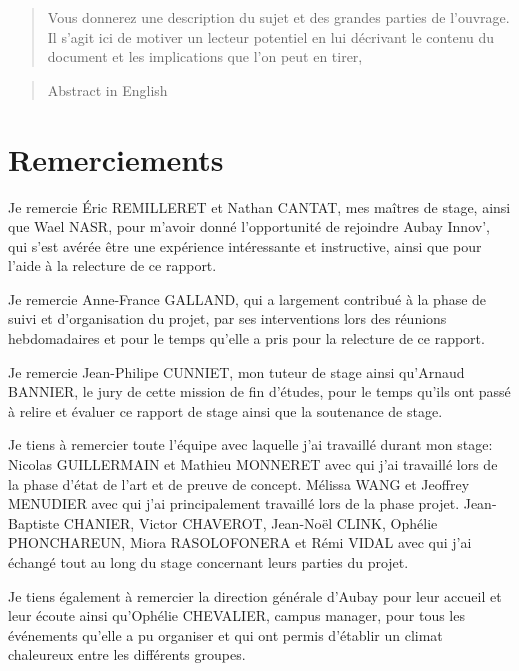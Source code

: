 \documentclass[11pt]{article}
\begin{document}
  \begin{abstract}
    Vous donnerez une description du
    sujet et des grandes parties de l’ouvrage. Il s’agit ici de motiver un lecteur potentiel en lui
    décrivant le contenu du document et les implications que l’on peut en tirer,
  \end{abstract}
  \pagebreak

  \begin{abstract}
    Abstract in English
  \end{abstract}
  \pagebreak

  \setcounter{tocdepth}{3}
  \tableofcontents

  \pagebreak

  \section{Remerciements}    
    Je remercie Éric REMILLERET et Nathan CANTAT, mes maîtres de stage, 
    ainsi que Wael NASR, pour m'avoir donné l'opportunité de rejoindre 
    Aubay Innov', qui s'est avérée être une expérience intéressante 
    et instructive, ainsi que pour l'aide à la relecture de ce rapport.    
    
    Je remercie Anne-France GALLAND, qui a largement contribué à la phase de suivi et d'organisation du projet, par ses interventions 
    lors des réunions hebdomadaires et pour le temps qu'elle a pris pour la relecture de ce rapport.    
    
    Je remercie Jean-Philipe CUNNIET, mon tuteur de stage ainsi qu'Arnaud BANNIER, le jury de cette mission de fin d'études, 
    pour le temps qu'ils ont passé à relire et évaluer ce rapport de stage ainsi que la soutenance de stage.    

    Je tiens à remercier toute l'équipe avec laquelle j'ai 
    travaillé durant mon stage:    
    Nicolas GUILLERMAIN et Mathieu MONNERET avec qui j'ai travaillé lors 
    de la phase d'état de l'art et de preuve de concept.
    Mélissa WANG et Jeoffrey MENUDIER avec qui j'ai principalement 
    travaillé lors de la phase projet. 
    Jean-Baptiste CHANIER, Victor CHAVEROT, Jean-Noël CLINK,
    Ophélie PHONCHAREUN, Miora RASOLOFONERA et Rémi VIDAL avec qui j'ai échangé tout au 
    long du stage concernant leurs parties du projet.       
    
    Je tiens également à remercier la direction générale d'Aubay pour leur accueil et leur écoute ainsi qu'Ophélie CHEVALIER, campus manager, 
    pour tous les événements qu'elle a pu organiser et qui ont permis d'établir un climat chaleureux entre les différents groupes.
        
\end{document}
